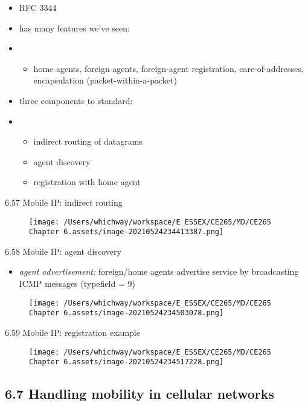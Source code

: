\documentclass[
]{article}
\begin{document}
\begin{itemize}
\item
  RFC 3344
\item
  has many features we've seen:
\item
  \begin{itemize}
  \item
    home agents, foreign agents, foreign-agent registration,
    care-of-addresses, encapsulation (packet-within-a-packet)
  \end{itemize}
\item
  three components to standard:
\item
  \begin{itemize}
  \item
    indirect routing of datagrams
  \item
    agent discovery
  \item
    registration with home agent
  \end{itemize}
\end{itemize}

6.57 Mobile IP: indirect routing

\begin{figure}
\centering
\texttt{[image: /Users/whichway/workspace/E\_ESSEX/CE265/MD/CE265 Chapter 6.assets/image-20210524234413387.png]}
\caption{}
\end{figure}

6.58 Mobile IP: agent discovery

\begin{itemize}
\item
  \emph{agent advertisement:} foreign/home agents advertise service by
  broadcasting ICMP messages (typefield = 9)
\end{itemize}

\begin{figure}
\centering
\texttt{[image: /Users/whichway/workspace/E\_ESSEX/CE265/MD/CE265 Chapter 6.assets/image-20210524234503078.png]}
\caption{}
\end{figure}

6.59 Mobile IP: registration example

\begin{figure}
\centering
\texttt{[image: /Users/whichway/workspace/E\_ESSEX/CE265/MD/CE265 Chapter 6.assets/image-20210524234517228.png]}
\caption{}
\end{figure}

\hypertarget{67-handling-mobility-in-cellular-networks}{%
\subsection{6.7 Handling mobility in cellular
networks}\label{67-handling-mobility-in-cellular-networks}}
\end{document}
